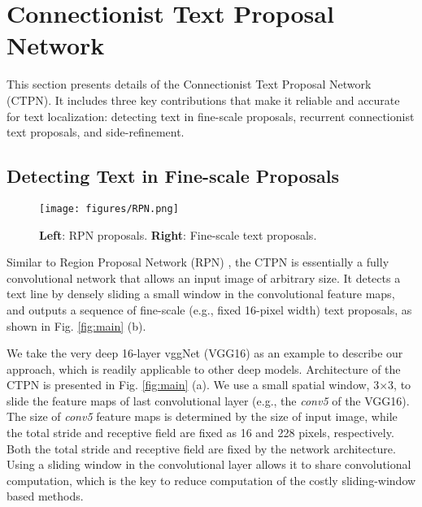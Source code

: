 \documentclass[runningheads]{llncs}
\begin{document}
\section{Connectionist Text Proposal Network}
This section presents  details of the Connectionist Text Proposal Network (CTPN). It includes three key contributions that make it reliable and accurate for text localization: detecting text in fine-scale proposals,  recurrent connectionist text proposals, and  side-refinement. 

\subsection{Detecting Text in Fine-scale Proposals}
 \begin{figure}[tb]
\centering
\texttt{[image: figures/RPN.png]}
\caption{\textbf{Left}: RPN proposals. \textbf{Right}: Fine-scale text proposals.}
\label{fig:RPN}
\end{figure}

Similar to Region Proposal Network (RPN) \cite{Ren2015}, the CTPN is essentially a fully convolutional network that allows an input image of arbitrary size. It detects a text line by densely sliding a small window in the convolutional feature maps, and outputs a sequence of fine-scale (e.g., fixed 16-pixel width) text proposals, as shown in Fig. \ref{fig:main} (b). 

We take the very deep 16-layer vggNet (VGG16) \cite{Simonyan2015} as an example to describe our approach, which is readily applicable to other deep models. Architecture of the CTPN is presented in Fig. \ref{fig:main} (a). We use a small spatial window, 3$\times$3, to slide the feature maps of last convolutional layer (e.g., the \textit{conv5} of the VGG16). The size of \textit{conv5} feature maps is determined by the size of input image, while the total stride and receptive field are fixed as 16 and 228 pixels, respectively.
Both the total stride and receptive field are fixed by the network architecture. 
Using a sliding window in the convolutional layer allows it to share convolutional computation, which is the key to reduce  computation of the costly sliding-window based methods.  
\end{document}
